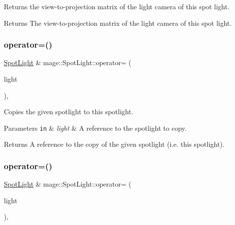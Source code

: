Returns the view-\/to-\/projection matrix of the light camera of this spot light.

\begin{DoxyReturn}{Returns}
The view-\/to-\/projection matrix of the light camera of this spot light. 
\end{DoxyReturn}
\hypertarget{classmage_1_1_spot_light_a5923f3d1ec5061965af8094e1e1d3855}{}\label{classmage_1_1_spot_light_a5923f3d1ec5061965af8094e1e1d3855} 
\subsubsection{\texorpdfstring{operator=()}{operator=()}\hspace{0.1cm}{\footnotesize\ttfamily [1/2]}}
{\footnotesize\ttfamily \hyperlink{classmage_1_1_spot_light}{Spot\+Light} \& mage\+::\+Spot\+Light\+::operator= (\begin{DoxyParamCaption}\item[{const \hyperlink{classmage_1_1_spot_light}{Spot\+Light} \&}]{light }\end{DoxyParamCaption})\hspace{0.3cm}{\ttfamily [default]}, {\ttfamily [noexcept]}}

Copies the given spotlight to this spotlight.


\begin{DoxyParams}[1]{Parameters}
\mbox{\tt in}  & {\em light} & A reference to the spotlight to copy. \\
\hline
\end{DoxyParams}
\begin{DoxyReturn}{Returns}
A reference to the copy of the given spotlight (i.\+e. this spotlight). 
\end{DoxyReturn}
\hypertarget{classmage_1_1_spot_light_a4a618538ddc977e4c81be098b35ed2ac}{}\label{classmage_1_1_spot_light_a4a618538ddc977e4c81be098b35ed2ac} 
\subsubsection{\texorpdfstring{operator=()}{operator=()}\hspace{0.1cm}{\footnotesize\ttfamily [2/2]}}
{\footnotesize\ttfamily \hyperlink{classmage_1_1_spot_light}{Spot\+Light} \& mage\+::\+Spot\+Light\+::operator= (\begin{DoxyParamCaption}\item[{\hyperlink{classmage_1_1_spot_light}{Spot\+Light} \&\&}]{light }\end{DoxyParamCaption})\hspace{0.3cm}{\ttfamily [default]}, {\ttfamily [noexcept]}}

